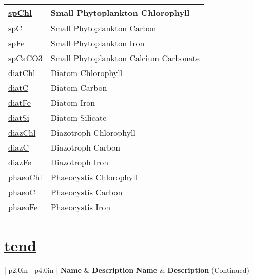 {\begin{center}
\begin{longtable}{| p{2.0in} | p{4.0in} |}
    \hline
    \hyperref[subsec:var_sec_tracers_spChl]{spChl} & Small Phytoplankton Chlorophyll \\
    \hline
    \hyperref[subsec:var_sec_tracers_spC]{spC} & Small Phytoplankton Carbon \\
    \hline
    \hyperref[subsec:var_sec_tracers_spFe]{spFe} & Small Phytoplankton Iron \\
    \hline
    \hyperref[subsec:var_sec_tracers_spCaCO3]{spCaCO3} & Small Phytoplankton Calcium Carbonate \\
    \hline
    \hyperref[subsec:var_sec_tracers_diatChl]{diatChl} & Diatom Chlorophyll \\
    \hline
    \hyperref[subsec:var_sec_tracers_diatC]{diatC} & Diatom Carbon \\
    \hline
    \hyperref[subsec:var_sec_tracers_diatFe]{diatFe} & Diatom Iron \\
    \hline
    \hyperref[subsec:var_sec_tracers_diatSi]{diatSi} & Diatom Silicate \\
    \hline
    \hyperref[subsec:var_sec_tracers_diazChl]{diazChl} & Diazotroph Chlorophyll \\
    \hline
    \hyperref[subsec:var_sec_tracers_diazC]{diazC} & Diazotroph Carbon \\
    \hline
    \hyperref[subsec:var_sec_tracers_diazFe]{diazFe} & Diazotroph Iron \\
    \hline
    \hyperref[subsec:var_sec_tracers_phaeoChl]{phaeoChl} & Phaeocystis Chlorophyll \\
    \hline
    \hyperref[subsec:var_sec_tracers_phaeoC]{phaeoC} & Phaeocystis Carbon \\
    \hline
    \hyperref[subsec:var_sec_tracers_phaeoFe]{phaeoFe} & Phaeocystis Iron \\
    \hline
\end{longtable}
\end{center}
}
\section[tend]{\hyperref[sec:var_sec_tend]{tend}}
\label{sec:var_tab_tend}

\vspace{0.5in}
{\small
\begin{center}
\begin{longtable}{| p{2.0in} | p{4.0in} |}
    \hline
    {\bf Name} & {\bf Description} \endfirsthead
    \hline 
    {\bf Name} & {\bf Description} (Continued) \endhead
    \hline
\end{longtable}
\end{center}
}
